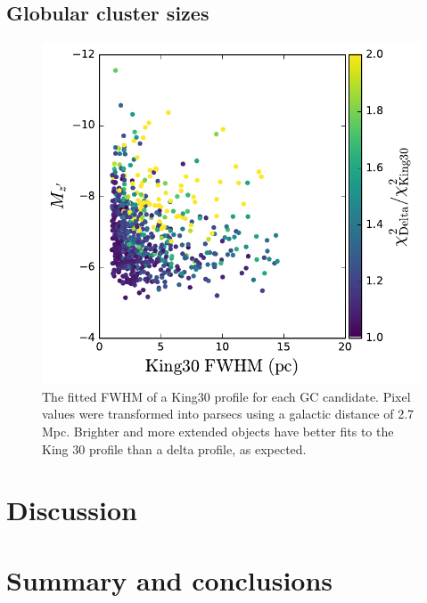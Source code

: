 \documentclass[useAMS,usenatbib]{mn2e}
\begin{document}
\lipsum[1-2]

\subsection{Globular cluster sizes}
\label{sec:gc_sizes}
\begin{figure}
	\includegraphics[width=\columnwidth]{images/kingFWHM.pdf}
	\caption{The fitted FWHM of a King30 profile for each GC candidate. Pixel values were transformed into parsecs using a galactic distance of 2.7 Mpc. Brighter and more extended objects have better fits to the King 30 profile than a delta profile, as expected.}
	\label{fig:kfwhm}
\end{figure}

\lipsum[1-2]

\section{Discussion}
\label{sec:discussion}

\lipsum[1-2]

\section{Summary and conclusions}
\label{sec:conclusions}
\end{document}
